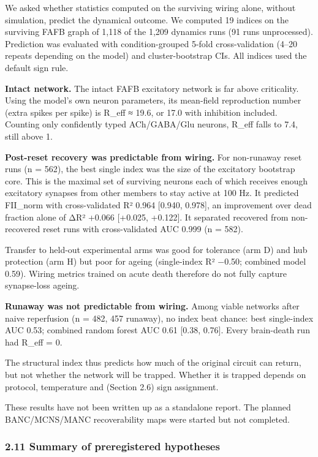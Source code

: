 \documentclass[11pt]{article}
\begin{document}
We asked whether statistics computed on the surviving wiring alone, without simulation, predict the dynamical outcome. We computed 19 indices on the surviving FAFB graph of 1,118 of the 1,209 dynamics runs (91 runs unprocessed). Prediction was evaluated with condition-grouped 5-fold cross-validation (4--20 repeats depending on the model) and cluster-bootstrap CIs. All indices used the default sign rule.

\textbf{Intact network.} The intact FAFB excitatory network is far above criticality. Using the model's own neuron parameters, its mean-field reproduction number (extra spikes per spike) is R\_eff ≈ 19.6, or 17.0 with inhibition included. Counting only confidently typed ACh/GABA/Glu neurons, R\_eff falls to 7.4, still above 1.

\textbf{Post-reset recovery was predictable from wiring.} For non-runaway reset runs (n = 562), the best single index was the size of the excitatory bootstrap core. This is the maximal set of surviving neurons each of which receives enough excitatory synapses from other members to stay active at 100 Hz. It predicted FII\_norm with cross-validated R² 0.964 {[}0.940, 0.978{]}, an improvement over dead fraction alone of ΔR² +0.066 {[}+0.025, +0.122{]}. It separated recovered from non-recovered reset runs with cross-validated AUC 0.999 (n = 582).

Transfer to held-out experimental arms was good for tolerance (arm D) and hub protection (arm H) but poor for ageing (single-index R² −0.50; combined model 0.59). Wiring metrics trained on acute death therefore do not fully capture synapse-loss ageing.

\textbf{Runaway was not predictable from wiring.} Among viable networks after naive reperfusion (n = 482, 457 runaway), no index beat chance: best single-index AUC 0.53; combined random forest AUC 0.61 {[}0.38, 0.76{]}. Every brain-death run had R\_eff = 0.

The structural index thus predicts how much of the original circuit can return, but not whether the network will be trapped. Whether it is trapped depends on protocol, temperature and (Section 2.6) sign assignment.

These results have not been written up as a standalone report. The planned BANC/MCNS/MANC recoverability maps were started but not completed.

\subsubsection{2.11 Summary of preregistered hypotheses}\label{summary-of-preregistered-hypotheses}
\end{document}
